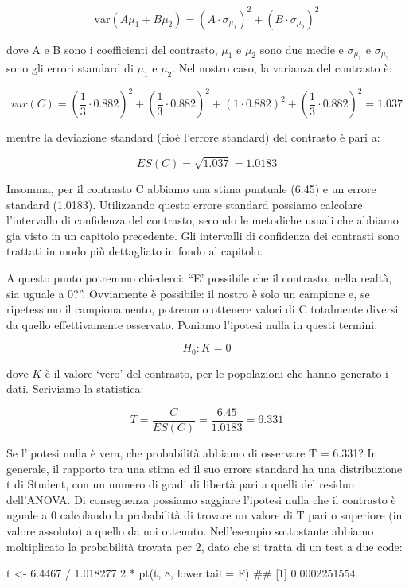 \documentclass[a4paper,12pt,oneside]{book}
\newenvironment{Shaded}{}{}
\newcommand{\KeywordTok}[1]{#1}
\newcommand{\DataTypeTok}[1]{#1}
\newcommand{\DecValTok}[1]{#1}
\newcommand{\FloatTok}[1]{#1}
\newcommand{\StringTok}[1]{#1}
\newcommand{\CommentTok}[1]{#1}
\newcommand{\OperatorTok}[1]{#1}
\newcommand{\NormalTok}[1]{#1}
\begin{document}
\[\textrm{var}(A \mu_1 + B \mu_2) = (A \cdot \sigma_{\mu_1} )^{2}  + (B \cdot \sigma_{\mu_2} ) ^ 2\]

dove A e B sono i coefficienti del contrasto, \(\mu_1\) e \(\mu_2\) sono due medie e \(\sigma_{\mu_1}\) e \(\sigma_{\mu_2}\) sono gli errori standard di \(\mu_1\) e \(\mu_2\). Nel nostro caso, la varianza del contrasto è:

\[var(C) = \left( \frac{1}{3} \cdot 0.882 \right)^2 +  \left( \frac{1}{3} \cdot 0.882 \right)^2 + \left( 1 \cdot 0.882 \right)^2 +  \left( \frac{1}{3} \cdot 0.882 \right)^2 = 1.037\]

mentre la deviazione standard (cioè l'errore standard) del contrasto è pari a:

\[ ES(C) = \sqrt{1.037} = 1.0183\]

Insomma, per il contrasto C abbiamo una stima puntuale (6.45) e un errore standard (1.0183). Utilizzando questo errore standard possiamo calcolare l'intervallo di confidenza del contrasto, secondo le metodiche usuali che abbiamo gia visto in un capitolo precedente. Gli intervalli di confidenza dei contrasti sono trattati in modo più dettagliato in fondo al capitolo.

A questo punto potremmo chiederci: ``E' possibile che il contrasto, nella realtà, sia uguale a 0?''. Ovviamente è possibile: il nostro è solo un campione e, se ripetessimo il campionamento, potremmo ottenere valori di C totalmente diversi da quello effettivamente osservato. Poniamo l'ipotesi nulla in questi termini:

\[H_0: K = 0\]

dove \(K\) è il valore `vero' del contrasto, per le popolazioni che hanno generato i dati. Scriviamo la statistica:

\[T = \frac{C}{ES(C)} = \frac{6.45}{1.0183} = 6.331\]

Se l'ipotesi nulla è vera, che probabilità abbiamo di osservare T = 6.331? In generale, il rapporto tra una stima ed il suo errore standard ha una distribuzione t di Student, con un numero di gradi di libertà pari a quelli del residuo dell'ANOVA. Di conseguenza possiamo saggiare l'ipotesi nulla che il contrasto è uguale a 0 calcolando la probabilità di trovare un valore di T pari o superiore (in valore assoluto) a quello da noi ottenuto. Nell'esempio sottostante abbiamo moltiplicato la probabilità trovata per 2, dato che si tratta di un test a due code:

\begin{Shaded}
\begin{Highlighting}[]
\NormalTok{t <-}\StringTok{ }\FloatTok{6.4467} \OperatorTok{/}\StringTok{ }\FloatTok{1.018277}
\DecValTok{2} \OperatorTok{*}\StringTok{ }\KeywordTok{pt}\NormalTok{(t, }\DecValTok{8}\NormalTok{, }\DataTypeTok{lower.tail =}\NormalTok{ F)}
\CommentTok{## [1] 0.0002251554}
\end{Highlighting}
\end{Shaded}
\end{document}
